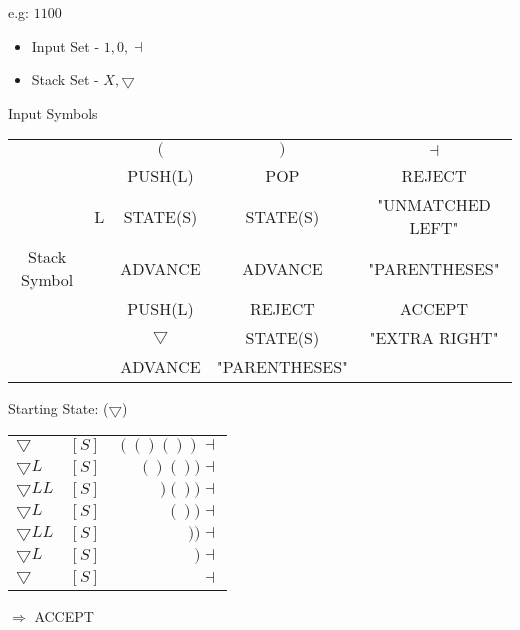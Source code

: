 \documentclass[a4paper,12pt]{article}
\begin{document}
e.g: $1100$

\begin{itemize}
\item Input Set - ${1, 0, \dashv}$

\item Stack Set - ${X, \bigtriangledown}$
\end{itemize}



Input Symbols

\begin{tabular}{|c|c|c|c|c|}
\hline
					&		&		$($		&		$)$			&		$\dashv$				\\
					&		&	PUSH(L)		&		POP			&		REJECT				\\		
					&	L	&	STATE(S)		&		STATE(S)		&		"UNMATCHED LEFT"	\\
Stack Symbol	&		&	ADVANCE		&		ADVANCE		&		"PARENTHESES" 		\\
\hline
					&		&	PUSH(L)		&		REJECT		&		ACCEPT				\\
				& & $\bigtriangledown$	&	STATE(S)			&		"EXTRA RIGHT"		\\
					&		&	ADVANCE		&	"PARENTHESES"	&								\\
\hline
\end{tabular}

Starting State: ($\bigtriangledown$)

\begin{tabular}{l c r}
$\bigtriangledown$		&	$[S]$	&	$( (  ) (  ) ) \dashv $ \\ 
$\bigtriangledown L$		&	$[S]$	&	$  (  ) (  ) ) \dashv $ \\ 
$\bigtriangledown LL$	&	$[S]$	&	$     ) (  ) ) \dashv $ \\ 
$\bigtriangledown L$		&	$[S]$	&	$		  (  ) ) \dashv $ \\ 
$\bigtriangledown LL$	&	$[S]$	&	$		     ) ) \dashv $ \\ 
$\bigtriangledown L$		&	$[S]$	&	$				 ) \dashv $ \\ 
$\bigtriangledown$		&	$[S]$	&	$ 					\dashv $ \\ 
\end{tabular}

$\Rightarrow$ ACCEPT
\end{document}
